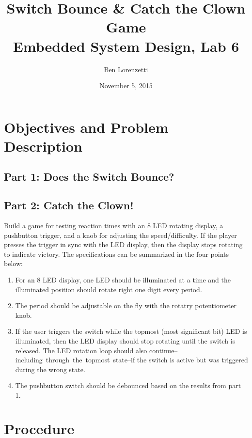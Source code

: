 \documentclass[11pt]{article}
\begin{document}
\title{Switch Bounce \& Catch the Clown Game\\Embedded System Design, Lab 6}
\date{November 5, 2015}
\author{Ben Lorenzetti}
\maketitle

\tableofcontents

\clearpage

\section{Objectives and Problem Description}

\subsection{Part 1: Does the Switch Bounce?}
\label{switch-debounce-problem-specs}

\subsection{Part 2: Catch the Clown!}
\label{catch-the-clown-problem-specs}

Build a game for testing reaction times with an 8 LED rotating display,
a pushbutton trigger, and a knob for adjusting the speed/difficulty.
If the player presses the trigger in sync with
the LED display, then the display stops rotating to indicate victory.
The specifications can be summarized in the four points below:
\begin{enumerate}
\item For an 8 LED display, one LED should be illuminated at a time and
the illuminated position should rotate right one digit every period.
\item The period should be adjustable on the fly with the rotatry potentiometer knob.
\item If the user triggers the switch while the topmost (most significant bit) 
LED is illuminated, then the LED display should stop rotating
until the switch is released. The LED rotation loop should also continue--\mbox{including
through the topmost state}--if the switch is active but was triggered
during the wrong state.
\item The pushbutton switch should be debounced based on the results from
part 1.
\end{enumerate}

\section{Procedure}
\end{document}
